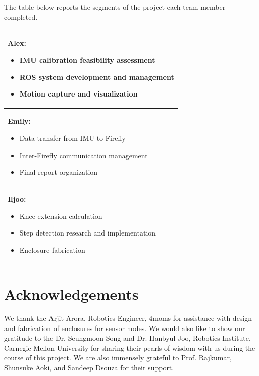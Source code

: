 \documentclass[conference]{IEEEtran}
\begin{document}
The table below reports the segments of the project each team member completed.\\
\begin{tabular}{|p{}|}
  \hline
{\bf Alex:}
\begin{itemize}
  \item {IMU calibration feasibility assessment}
  \item ROS system development and management
  \item Motion capture and visualization
\end{itemize}\tabularnewline
\hline
{\bf Emily:}
\begin{itemize}
  \item{Data transfer from IMU to Firefly}
  \item{Inter-Firefly communication management}
  \item{Final report organization} 
\end{itemize}\tabularnewline
\hline
{\bf Iljoo:}
\begin{itemize}
  \item{Knee extension calculation} 
  \item{Step detection research and implementation}
  \item{Enclosure fabrication} 
\end{itemize}\tabularnewline
  \hline
\end{tabular}

\section*{Acknowledgements}
We thank the Arjit Arora, Robotics Engineer, 4moms for assistance with design and
fabrication of enclosures for sensor nodes. We would also like to show our gratitude to
the Dr. Seungmoon Song and Dr. Hanbyul Joo, Robotics Institute, Carnegie Mellon University
for sharing their pearls of wisdom with us during the course of this project. We are also
immensely grateful to Prof. Rajkumar, Shunsuke Aoki, and Sandeep Dsouza for their
support.


\end{document}
